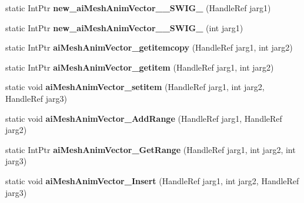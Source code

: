 \begin{DoxyCompactItemize}
\item 
\hypertarget{class_assimp_p_i_n_v_o_k_e_a67c18c0854f0ca63890ba10a29b0e725}{static Int\+Ptr {\bfseries new\+\_\+ai\+Mesh\+Anim\+Vector\+\_\+\+\_\+\+S\+W\+I\+G\+\_} (Handle\+Ref jarg1)}\label{class_assimp_p_i_n_v_o_k_e_a67c18c0854f0ca63890ba10a29b0e725}

\item 
\hypertarget{class_assimp_p_i_n_v_o_k_e_aa67d6131de78c8178cca83565db343af}{static Int\+Ptr {\bfseries new\+\_\+ai\+Mesh\+Anim\+Vector\+\_\+\+\_\+\+S\+W\+I\+G\+\_} (int jarg1)}\label{class_assimp_p_i_n_v_o_k_e_aa67d6131de78c8178cca83565db343af}

\item 
\hypertarget{class_assimp_p_i_n_v_o_k_e_abe4c9dff059e6634723882f327f5dccd}{static Int\+Ptr {\bfseries ai\+Mesh\+Anim\+Vector\+\_\+getitemcopy} (Handle\+Ref jarg1, int jarg2)}\label{class_assimp_p_i_n_v_o_k_e_abe4c9dff059e6634723882f327f5dccd}

\item 
\hypertarget{class_assimp_p_i_n_v_o_k_e_a97010a6c8f5d5cfccb860c28b2c83567}{static Int\+Ptr {\bfseries ai\+Mesh\+Anim\+Vector\+\_\+getitem} (Handle\+Ref jarg1, int jarg2)}\label{class_assimp_p_i_n_v_o_k_e_a97010a6c8f5d5cfccb860c28b2c83567}

\item 
\hypertarget{class_assimp_p_i_n_v_o_k_e_a70f3a62df25f6209591bdeff1c92c5c3}{static void {\bfseries ai\+Mesh\+Anim\+Vector\+\_\+setitem} (Handle\+Ref jarg1, int jarg2, Handle\+Ref jarg3)}\label{class_assimp_p_i_n_v_o_k_e_a70f3a62df25f6209591bdeff1c92c5c3}

\item 
\hypertarget{class_assimp_p_i_n_v_o_k_e_ab9e0293fed523dabac57a33219489777}{static void {\bfseries ai\+Mesh\+Anim\+Vector\+\_\+\+Add\+Range} (Handle\+Ref jarg1, Handle\+Ref jarg2)}\label{class_assimp_p_i_n_v_o_k_e_ab9e0293fed523dabac57a33219489777}

\item 
\hypertarget{class_assimp_p_i_n_v_o_k_e_ac1a49aded728475f97b465df9d8af4f5}{static Int\+Ptr {\bfseries ai\+Mesh\+Anim\+Vector\+\_\+\+Get\+Range} (Handle\+Ref jarg1, int jarg2, int jarg3)}\label{class_assimp_p_i_n_v_o_k_e_ac1a49aded728475f97b465df9d8af4f5}

\item 
\hypertarget{class_assimp_p_i_n_v_o_k_e_a8328974f03a0412cebce7d4586a2c970}{static void {\bfseries ai\+Mesh\+Anim\+Vector\+\_\+\+Insert} (Handle\+Ref jarg1, int jarg2, Handle\+Ref jarg3)}\label{class_assimp_p_i_n_v_o_k_e_a8328974f03a0412cebce7d4586a2c970}


\end{DoxyCompactItemize}

